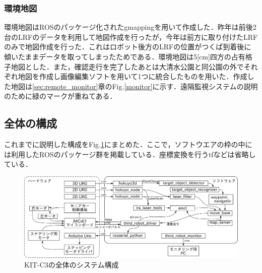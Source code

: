 \documentclass[10pt,a4paper]{jarticle}
\begin{document}
\subsubsection{環境地図}
環境地図はROSのパッケージ化されたgmappingを用いて作成した．昨年は前後2台のLRFのデータを利用して地図作成を行ったが，今年は前方に取り付けたLRFのみで地図作成を行った．これはロボット後方のLRFの位置がつくば到着後に傾いたままデータを取ってしまったためである．環境地図は5[cm]四方の占有格子地図とした．また，確認走行を完了したあとは大清水公園と同公園の外でそれぞれ地図を作成し画像編集ソフトを用いて1つに統合したものを用いた．作成した地図は\ref{sec:remote_monitor}章のFig.\ref{monitor}に示す．遠隔監視システムの説明のために緑のマークが重ねてある．

\subsection{全体の構成}
これまでに説明した構成をFig.\ref{184559_7Dec16}にまとめた．ここで，ソフトウエアの枠の中には利用したROSのパッケージ群を掲載している．座標変換を行うtfなどは省略している．
\begin{figure}[ht]
 \centering
 \includegraphics[width=16cm]{./fig/eps/whole_system.eps}
 \caption{KIT-C3の全体のシステム構成}
 \label{184559_7Dec16}
\end{figure}
\end{document}
